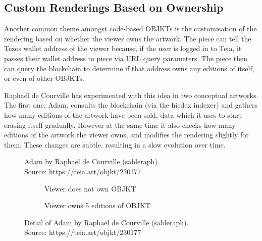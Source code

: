 \subsection{Custom Renderings Based on Ownership}

Another common theme amongst code-based OBJKTs is the customisation of the rendering based on whether the viewer owns the artwork. The piece can tell the Tezos wallet address of the viewer because, if the user is logged in to Teia, it passes their wallet address to piece via URL query parameters. The piece then can query the blockchain to determine if that address owns any editions of itself, or even of other OBJKTs.

Raphaël de Courville has experimented with this idea in two conceptual artworks. The first one, Adam, consults the blockchain (via the hicdex indexer) and gathers how many editions of the artwork have been sold, data which it uses to start erasing itself gradually. However at the same time it also checks how many editions of the artwork the viewer owns, and modifies the rendering slightly for them. These changes are subtle, resulting in a slow evolution over time.

\begin{figure}[h]
    \centering
    \captionsetup{justification=centering}
    \captionsetup{justification=centering}
    \caption[Adam by Raphaël de Courville (sableraph)]{Adam by Raphaël de Courville (sableraph). \\ Source: https://teia.art/objkt/230177}
    \label{fig:mondrian}
\end{figure}


\begin{figure}[H]
  \centering
  \captionsetup{justification=centering}
  \begin{subfigure}[b]{0.45\textwidth}
    \centering
    \caption{Viewer does not own OBJKT}
    \label{fig:adam-no-own}
  \end{subfigure}
  \hfill
  \begin{subfigure}[b]{0.45\textwidth}
    \centering
    \caption{Viewer owns 5 editions of OBJKT}
    \label{fig:adam-own}
  \end{subfigure}
  \caption[Detail of Adam by Raphaël de Courville (sableraph)]{Detail of Adam by Raphaël de Courville (sableraph). \\ Source: https://teia.art/objkt/230177}
  \label{fig:vdp-examples}
\end{figure}

